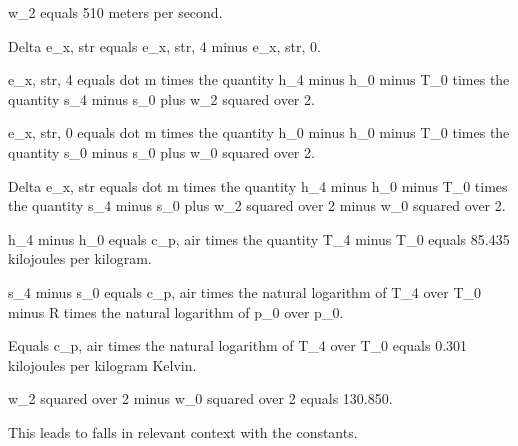 w_2 equals 510 meters per second.

Delta e_x, str equals e_x, str, 4 minus e_x, str, 0.

e_x, str, 4 equals dot m times the quantity h_4 minus h_0 minus T_0 times the quantity s_4 minus s_0 plus w_2 squared over 2.

e_x, str, 0 equals dot m times the quantity h_0 minus h_0 minus T_0 times the quantity s_0 minus s_0 plus w_0 squared over 2.

Delta e_x, str equals dot m times the quantity h_4 minus h_0 minus T_0 times the quantity s_4 minus s_0 plus w_2 squared over 2 minus w_0 squared over 2.

h_4 minus h_0 equals c_p, air times the quantity T_4 minus T_0 equals 85.435 kilojoules per kilogram.

s_4 minus s_0 equals c_p, air times the natural logarithm of T_4 over T_0 minus R times the natural logarithm of p_0 over p_0.

Equals c_p, air times the natural logarithm of T_4 over T_0 equals 0.301 kilojoules per kilogram Kelvin.

w_2 squared over 2 minus w_0 squared over 2 equals 130.850.

This leads to falls in relevant context with the constants.